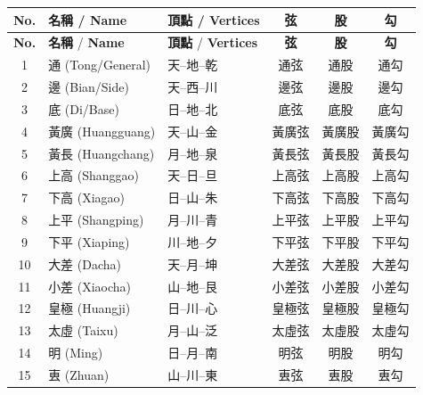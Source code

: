 \documentclass[11pt,a4paper]{article}
\newcommand{\zh}[1]{{\CJKfamily{sf}#1}}
\begin{document}
\begin{center}
\small
\begin{longtable}{|c|l|l|c|c|c|}
\hline
\textbf{No.} & \textbf{\zh{名稱}} / \textbf{Name} & \textbf{\zh{頂點}} / \textbf{Vertices} & \textbf{\zh{弦}} & \textbf{\zh{股}} & \textbf{\zh{勾}} \\
\hline
\endfirsthead
\hline
\textbf{No.} & \textbf{\zh{名稱}} / \textbf{Name} & \textbf{\zh{頂點}} / \textbf{Vertices} & \textbf{\zh{弦}} & \textbf{\zh{股}} & \textbf{\zh{勾}} \\
\hline
\endhead
1 & \zh{通} (Tong/General) & \zh{天--地--乾} & \zh{通弦} & \zh{通股} & \zh{通勾} \\
2 & \zh{邊} (Bian/Side) & \zh{天--西--川} & \zh{邊弦} & \zh{邊股} & \zh{邊勾} \\
3 & \zh{底} (Di/Base) & \zh{日--地--北} & \zh{底弦} & \zh{底股} & \zh{底勾} \\
4 & \zh{黃廣} (Huangguang) & \zh{天--山--金} & \zh{黃廣弦} & \zh{黃廣股} & \zh{黃廣勾} \\
5 & \zh{黃長} (Huangchang) & \zh{月--地--泉} & \zh{黃長弦} & \zh{黃長股} & \zh{黃長勾} \\
6 & \zh{上高} (Shanggao) & \zh{天--日--旦} & \zh{上高弦} & \zh{上高股} & \zh{上高勾} \\
7 & \zh{下高} (Xiagao) & \zh{日--山--朱} & \zh{下高弦} & \zh{下高股} & \zh{下高勾} \\
8 & \zh{上平} (Shangping) & \zh{月--川--青} & \zh{上平弦} & \zh{上平股} & \zh{上平勾} \\
9 & \zh{下平} (Xiaping) & \zh{川--地--夕} & \zh{下平弦} & \zh{下平股} & \zh{下平勾} \\
10 & \zh{大差} (Dacha) & \zh{天--月--坤} & \zh{大差弦} & \zh{大差股} & \zh{大差勾} \\
11 & \zh{小差} (Xiaocha) & \zh{山--地--艮} & \zh{小差弦} & \zh{小差股} & \zh{小差勾} \\
12 & \zh{皇極} (Huangji) & \zh{日--川--心} & \zh{皇極弦} & \zh{皇極股} & \zh{皇極勾} \\
13 & \zh{太虛} (Taixu) & \zh{月--山--泛} & \zh{太虛弦} & \zh{太虛股} & \zh{太虛勾} \\
14 & \zh{明} (Ming) & \zh{日--月--南} & \zh{明弦} & \zh{明股} & \zh{明勾} \\
15 & \zh{叀} (Zhuan) & \zh{山--川--東} & \zh{叀弦} & \zh{叀股} & \zh{叀勾} \\
\hline
\end{longtable}
\end{center}
\end{document}
